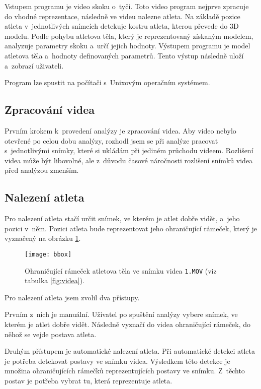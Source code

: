 Vstupem programu je video skoku o~tyči. Toto video program nejprve zpracuje do vhodné reprezentace, následně ve videu nalezne atleta. Na základě pozice atleta v~jednotlivých snímcích detekuje kostru atleta, kterou převede do 3D modelu. Podle pohybu atletova těla, který je reprezentovaný získaným modelem, analyzuje parametry skoku a~určí jejich hodnoty. Výstupem programu je model atletova těla a~hodnoty definovaných parametrů. Tento výstup následně uloží a~zobrazí uživateli.

Program lze spustit na počítači s~Unixovým operačním systémem.



\subsection{Zpracování videa}

Prvním krokem k~provedení analýzy je zpracování videa. Aby video nebylo otevřené po celou dobu analýzy, rozhodl jsem se při analýze pracovat s~jednotlivými snímky, které si ukládám při jediném průchodu videem. Rozlišení videa může být libovolné, ale z~důvodu časové náročnosti rozlišení snímků videa před analýzou zmenším.



\subsection{Nalezení atleta}

Pro nalezení atleta stačí určit snímek, ve kterém je atlet dobře vidět, a~jeho pozici v~něm. Pozici atleta bude reprezentovat jeho ohraničující rámeček, který je vyznačený na obrázku \ref{fig:bbox}.

\begin{figure}[h]\centering
    \texttt{[image: bbox]}
    \caption{
        \centering\small
        Ohraničující rámeček atletova těla ve snímku videa \texttt{1.MOV} (viz tabulka \ref{fig:videa}).
    }
    \label{fig:bbox}
\end{figure}

Pro nalezení atleta jsem zvolil dva přístupy.

Prvním z~nich je manuální. Uživatel po spuštění analýzy vybere snímek, ve kterém je atlet dobře vidět. Následně vyznačí do videa ohraničující rámeček, do něhož se vejde postava atleta.

Druhým přístupem je automatické nalezení atleta. Při automatické detekci atleta je potřeba detekovat postavy ve snímku videa. Výsledkem této detekce je množina ohraničujících rámečků reprezentujících postavy ve snímku. Z~těchto postav je potřeba vybrat tu, která reprezentuje atleta.

